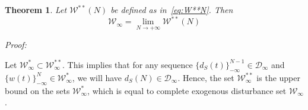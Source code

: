 \documentclass[letterpaper, 10 pt, conference]{ieeeconf}  %
\newtheorem{theorem}{Theorem}
\newcommand{\AB}[1]{\textbf{\color{magenta}{[AB: #1]}}}
\begin{document}
\begin{theorem}
Let $\mathcal{W}^{**}(N)$ be defined as in~\eqref{eq:W**N}. Then
\[
    \mathcal{W}_{\infty} = \lim_{N\rightarrow+\infty}\mathcal{W}^{**}(N)
\]
\end{theorem}
	\textit{Proof:} 
\AB{To be redone, according to new notation and Lemma 1}

{\color{gray}
Let $\mathcal{W}^{*}_{\infty} \subset \mathcal{W}^{**}_{\infty}$. This implies that for any sequence $\{d_S(t)\}_{-\infty}^{N-1} \in \mathcal{D}_{\infty}$ and $\{w(t)\}_{-\infty}^N \in \mathcal{W}^*_{\infty}$, we will have $d_S(N) \in \mathcal{D}_{\infty}$. Hence, the set $\mathcal{W}^{**}_{\infty}$ is the upper bound on the sets $\mathcal{W}^{*}_{\infty}$, which is equal to complete exogenous disturbance set $\mathcal{W}_{\infty}$. 
}\hfill\QED
\end{document}
